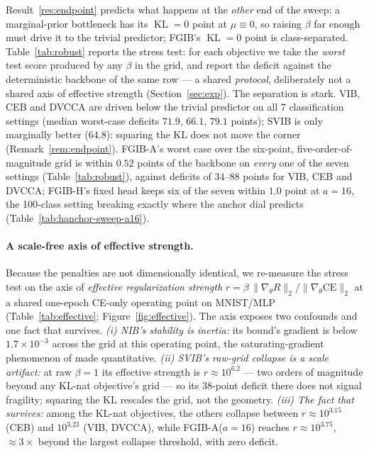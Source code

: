 \documentclass{article} %
\newcommand{\KLd}{\operatorname{KL}}
\begin{document}
Result~\ref{res:endpoint} predicts what happens at the \emph{other} end of the sweep: a
marginal-prior bottleneck has its $\KLd = 0$ point at $\mu \equiv 0$, so raising $\beta$
far enough must drive it to the trivial predictor; FGIB's $\KLd = 0$ point is
class-separated. Table~\ref{tab:robust} reports the stress test: for each objective we
take the \emph{worst} test score produced by any $\beta$ in the grid, and report the
deficit against the deterministic backbone of the same row --- a shared \emph{protocol},
deliberately not a shared axis of effective strength (Section~\ref{sec:exp}). The
separation is stark. VIB, CEB and DVCCA are driven below the trivial predictor on all 7
classification settings (median worst-case deficits $71.9$, $66.1$, $79.1$ points);
SVIB is only marginally better ($64.8$): squaring the KL does not move the corner
(Remark~\ref{rem:endpoint}). FGIB-A's worst case over the six-point,
five-order-of-magnitude grid is within $0.52$ points of the backbone on \emph{every}
one of the seven settings (Table~\ref{tab:robust}), against deficits of $34$--$88$
points for VIB, CEB and DVCCA; FGIB-H's fixed head keeps six of the seven within $1.0$
point at $a{=}16$, the 100-class setting breaking exactly where the anchor dial
predicts (Table~\ref{tab:hanchor-sweep-a16}).



\paragraph{A scale-free axis of effective strength.}
Because the penalties are not dimensionally identical, we re-measure the stress test on
the axis of \emph{effective regularization strength}
$r = \beta\,\lVert\nabla_\theta R\rVert_2 / \lVert\nabla_\theta \mathrm{CE}\rVert_2$
at a shared one-epoch CE-only operating point on MNIST/MLP (Table~\ref{tab:effective};
Figure~\ref{fig:effective}). The axis exposes two confounds and one fact that survives.
\emph{(i) NIB's stability is inertia:} its bound's gradient is below $1.7\times10^{-3}$
across the grid at this operating point, the saturating-gradient phenomenon of
\citet[\S IV A]{kolchinsky2019nib} made quantitative. \emph{(ii) SVIB's raw-grid
collapse is a scale artifact:} at raw $\beta = 1$ its effective strength is
$r \approx 10^{6.2}$ --- two orders of magnitude beyond any KL-nat objective's grid ---
so its $38$-point deficit there does not signal fragility; squaring the KL rescales
the grid, not the geometry. \emph{(iii) The fact that survives:} among the KL-nat
objectives, the others collapse between $r \approx 10^{3.15}$ (CEB) and $10^{3.23}$
(VIB, DVCCA), while FGIB-A($a{=}16$) reaches $r \approx 10^{3.75}$, $\approx 3\times$
beyond the largest collapse threshold, with zero deficit.
\end{document}
